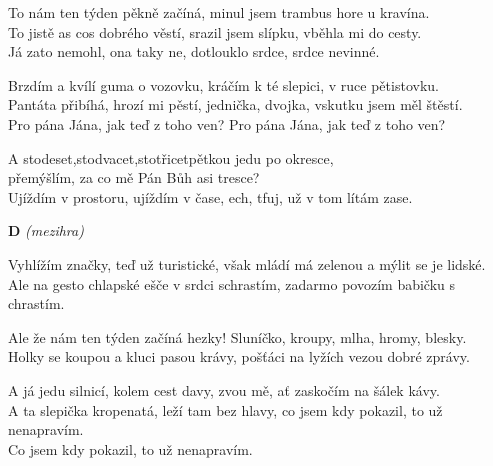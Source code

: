  

\nv{}To nám ten týden pěkně začíná, minul jsem trambus hore u kravína.\\
To jistě as cos dobrého věstí, srazil jsem slípku, vběhla mi do cesty.\\
Já zato nemohl, ona taky ne, dotlouklo srdce, srdce nevinné.
\vnv

\nv Brzdím a kvílí guma o vozovku, kráčím k té slepici, v ruce pětistovku.\\
Pantáta přibíhá, hrozí mi pěstí, jednička, dvojka, vskutku jsem měl štěstí.\\
Pro pána Jána, jak teď z toho ven? Pro pána Jána, jak teď z toho ven?
\vnv

\nv A stodeset,\sm stodvacet,\nc{}stotřicetpětkou jedu po okresce,\\
přemýšlím, za co mě Pán Bůh asi tresce? \nc{}\\
Ujíždím v prostoru, ujíždím v čase, ech, tfuj, už v tom lítám zase.
\vspace{5mm}

\nv\textbf{D} \emph{(mezihra)}
\vspace{5mm}

\nv{}Vyhlížím značky, teď už turistické, však mládí má zelenou a mýlit se je lidské.\\
Ale na gesto chlapské ešče v srdci schrastím, zadarmo povozím babičku s chrastím.
\vnv

\nv Ale že nám ten týden začíná hezky! Sluníčko, kroupy, mlha, hromy, blesky.\\
Holky se koupou a kluci pasou krávy, pošťáci na lyžích vezou dobré zprávy.
\vnv

\nv A já jedu silnicí, kolem cest davy, zvou mě, ať zaskočím na šálek kávy.\\
A ta slepička kropenatá, leží tam bez hlavy, co jsem kdy pokazil, to už nenapravím.\\
Co jsem kdy pokazil, to už nenapravím.
\newpage
